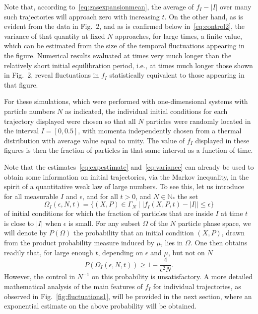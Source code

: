 \documentclass{article}
\newcommand {\N}{\mathbb{N}}
\numberwithin{equation}{section}
\begin{document}
Note that, according to~\eqref{eq:gasexpansionmean}, the average of $f_I - |I|$ over many such trajectories will approach zero with increasing $t$. On the other hand, as is evident from the data in Fig.~2, and as is confirmed below in~\eqref{eq:control2}, the variance of that quantity at fixed $N$ approaches, for large times, a finite value, which can be estimated from the size of the temporal fluctuations appearing in the figure.  Numerical results evaluated at times very much longer than the relatively short initial equilibration period, i.e., at times much longer those shown in Fig.~2, reveal fluctuations in $f_I$ statistically equivalent to those appearing in that figure.



For these simulations, which were performed with one-dimensional systems with particle numbers $N$ as indicated, the individual initial conditions for each trajectory displayed were chosen so that all $N$ particles were randomly located in the interval $I=[0,0.5]$, with momenta independently chosen from a thermal distribution with average value equal to unity. The value of $f_I$ displayed in these figures  is then
the fraction of particles in that same interval as a function of time.

Note that the estimates~\eqref{eq:expestimate} and~\eqref{eq:variance} can already be used to obtain some information on initial trajectories, via the Markov inequality, in the spirit of a quantitative weak law of large numbers. To see this, let us introduce for all measurable $I$ and $\epsilon$, and for all $t>0$, and $N\in\N_*$ the set
\begin{equation}\label{eq:goodset}
\Omega_I(\epsilon, N, t)=\{(X, P)\in\Gamma_N\mid |f_I(X,P,t)-|I|\mid\leq \epsilon\}
\end{equation}
of initial conditions for which the fraction of particles that are inside $I$ at time $t$ is close to $|I|$ when $\epsilon$ is small. For any subset $\Omega$ of the $N$ particle phase space, we will denote by $P(\Omega)$ the probability that an initial condition $(X,P)$, drawn from the product probability measure induced by $\mu$, lies in $\Omega$. One then obtains readily that, for large enough $t$, depending on $\epsilon$ and $\mu$, but not on $N$
$$
P(\Omega_I(\epsilon, N, t))\geq 1-\frac{4}{\epsilon^2N}.
$$
However, the control in $N^{-1}$ on this probability is unsatisfactory.
A more detailed mathematical analysis of the main features of $f_I$ for individual trajectories, as observed in Fig.~\ref{fig:fluctuations1}, will be provided in the next section, where an exponential estimate on the above probability will be obtained.
\end{document}
